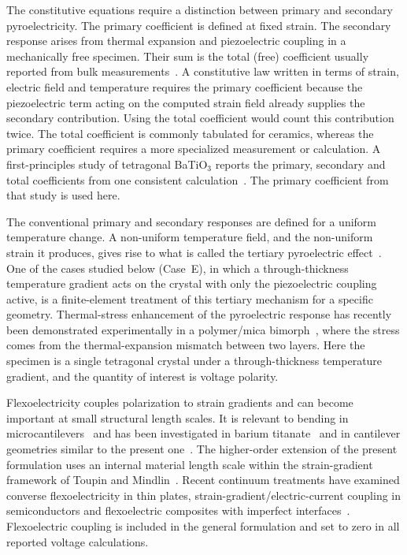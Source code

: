 \documentclass[a4paper,12pt]{elsarticle}
\begin{document}
The constitutive equations require a distinction between primary and
secondary pyroelectricity. The primary coefficient is defined at fixed
strain. The secondary response arises from thermal expansion and
piezoelectric coupling in a mechanically free specimen. Their sum is
the total (free) coefficient usually reported from bulk
measurements~\cite{Lang2005Pyro,Tagantsev1991,Lubomirsky2012}. A
constitutive law written in terms of strain, electric field and
temperature requires the primary coefficient because the piezoelectric
term acting on the computed strain field already supplies the secondary
contribution. Using the total coefficient would count this contribution
twice. The total coefficient is commonly tabulated for ceramics, whereas
the primary coefficient requires a more specialized measurement or
calculation. A first-principles study of tetragonal BaTiO$_3$ reports
the primary, secondary and total coefficients from one consistent
calculation~\cite{EklundKarttunen2023}. The primary coefficient from that
study is used here.

The conventional primary and secondary responses are defined for a
uniform temperature change. A non-uniform temperature field, and the
non-uniform strain it produces, gives rise to what is called the
tertiary pyroelectric effect~\cite{Lang2005Pyro}. One of the cases
studied below (Case~E), in which a through-thickness temperature
gradient acts on the crystal with only the piezoelectric coupling
active, is a finite-element treatment of this tertiary mechanism for
a specific geometry. Thermal-stress enhancement of the pyroelectric
response has recently been demonstrated experimentally in a polymer/mica
bimorph~\cite{Su2026ThermalStressPyro}, where the stress comes from
the thermal-expansion mismatch between two layers. Here the specimen
is a single tetragonal crystal under a through-thickness temperature
gradient, and the quantity of interest is voltage polarity.

Flexoelectricity couples polarization to strain gradients and can
become important at small structural length scales. It is relevant to
bending in microcantilevers~\cite{Tagantsev1986,Cross2006,Zubko2013}
and has been investigated in barium titanate~\cite{MaCross2006} and in
cantilever geometries similar to the present one~\cite{Huang2007,Mao2016,Abdollahi2014}.
The higher-order extension of the present formulation uses an internal
material length scale within the strain-gradient framework of Toupin
and Mindlin~\cite{Toupin1962,Mindlin1964,MindlinEshel1968}. Recent
continuum treatments have examined converse flexoelectricity in thin
plates, strain-gradient/electric-current coupling in semiconductors
and flexoelectric composites with imperfect
interfaces~\cite{IJESYurkov2023,IJESQu2025,IJESSerpilli2026}.
Flexoelectric coupling is included in the general formulation and set
to zero in all reported voltage calculations.
\end{document}
